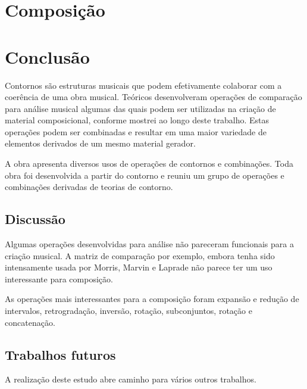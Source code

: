 \chapter{Composição}
\label{cha:composicao}



\chapter{Conclusão}
\label{cha:conclusao}

Contornos são estruturas musicais que podem efetivamente colaborar com
a coerência de uma obra musical. Teóricos desenvolveram operações de
comparação para análise musical algumas das quais podem ser utilizadas
na criação de material composicional, conforme mostrei ao longo deste
trabalho. Estas operações podem ser combinadas e resultar em uma maior
variedade de elementos derivados de um mesmo material gerador.

A obra \obra{} apresenta diversos usos de operações de contornos e
combinações. Toda obra foi desenvolvida a partir do contorno \contpr{}
e reuniu um grupo de operações e combinações derivadas de teorias de
contorno.

\section{Discussão}
\label{sec:discussao}


Algumas operações desenvolvidas para análise não pareceram funcionais
para a criação musical. A matriz de comparação por exemplo, embora
tenha sido intensamente usada por Morris, Marvin e Laprade não parece
ter um uso interessante para composição.


As operações mais interessantes para a composição foram expansão e
redução de intervalos, retrogradação, inversão, rotação, subconjuntos,
rotação e concatenação.

\section{Trabalhos futuros}
\label{sec:trabalhos-futuros}

A realização deste estudo abre caminho para vários outros trabalhos.


